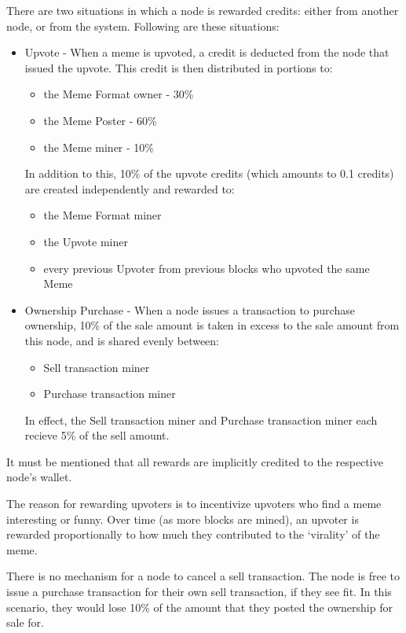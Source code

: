 \documentclass[12pt]{article}
\begin{document}
There are two situations in which a node is rewarded credits: either from another node, or from the system. Following are these situations:

\begin{itemize}
\item Upvote - When a meme is upvoted, a credit is deducted from the
  node that issued the upvote. This credit is then distributed in
  portions to:
  \begin{itemize}
  \item the Meme Format owner - 30\%
  \item the Meme Poster - 60\%
  \item the Meme miner - 10\%
  \end{itemize}
  In addition to this, 10\% of the upvote credits (which amounts to
  0.1 credits) are created independently and rewarded to:
  \begin{itemize}
  \item the Meme Format miner
  \item the Upvote miner
  \item every previous Upvoter from previous blocks who upvoted the
    same Meme
  \end{itemize}
\item Ownership Purchase - When a node issues a transaction to
  purchase ownership, 10\% of the sale amount is taken in excess to
  the sale amount from this node, and is shared evenly between:
  \begin{itemize}
  \item Sell transaction miner
  \item Purchase transaction miner
  \end{itemize}
  In effect, the Sell transaction miner and Purchase transaction miner
  each recieve 5\% of the sell amount.
\end{itemize}

It must be mentioned that all rewards are implicitly credited to the
respective node's wallet.

The reason for rewarding upvoters is to incentivize upvoters who find
a meme interesting or funny. Over time (as more blocks are mined), an
upvoter is rewarded proportionally to how much they contributed to the
`virality' of the meme.

There is no mechanism for a node to cancel a sell transaction. The
node is free to issue a purchase transaction for their own sell
transaction, if they see fit. In this scenario, they would lose 10\%
of the amount that they posted the ownership for sale for.
\end{document}
